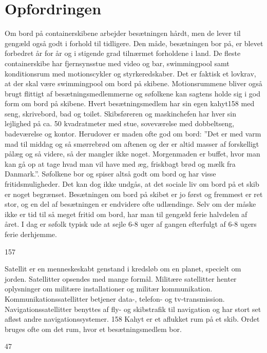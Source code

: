 \chapter{Opfordringen}\label{opfordringen}

Om bord på containerskibene arbejder besætningen hårdt, men de lever til
gengæld også godt i forhold til tidligere. Den måde, besætningen bor på,
er blevet forbedret år for år og i stigende grad tilnærmet forholdene i
land. De fleste containerskibe har fjernsynsstue med video og bar,
swimmingpool samt konditionsrum med motionscykler og styrkeredskaber.
Det er faktisk et lovkrav, at der skal være swimmingpool om bord på
skibene. Motionsrummene bliver også brugt flittigt af
besætningsmedlemmerne og søfolkene kan sagtens holde sig i god form om
bord på skibene. Hvert besætningsmedlem har sin egen kahyt158 med seng,
skrivebord, bad og toilet. Skibsføreren og maskinchefen har hver sin
lejlighed på ca. 50 kvadratmeter med stue, soveværelse med dobbeltseng,
badeværelse og kontor. Herudover er maden ofte god om bord: ''Det er med
varm mad til middag og så smørrebrød om aftenen og der er altid masser
af forskelligt pålæg og så videre, så der mangler ikke noget.
Morgenmaden er buffet, hvor man kan gå op at tage hvad man vil have med
æg, friskbagt brød og mælk fra Danmark.''. Søfolkene bor og spiser altså
godt om bord og har visse fritidsmuligheder. Det kan dog ikke undgås, at
det sociale liv om bord på et skib er noget begrænset. Besætningen om
bord på skibet er jo først og fremmest er ret stor, og en del af
besætningen er endvidere ofte udlændinge. Selv om der måske ikke er tid
til så meget fritid om bord, har man til gengæld ferie halvdelen af
året. I dag er søfolk typisk ude at sejle 6-8 uger af gangen efterfulgt
af 6-8 ugers ferie derhjemme.

157

Satellit er en menneskeskabt genstand i kredsløb om en planet, specielt
om jorden. Satellitter opsendes med mange formål. Militære satellitter
henter oplysninger om militære installationer og militær kommunikation.
Kommunikationssatellitter betjener data-, telefon- og tv-transmission.
Navigationssatellitter benyttes af fly- og skibstrafik til navigation og
har stort set afløst andre navigationssystemer. 158 Kahyt er et aflukket
rum på et skib. Ordet bruges ofte om det rum, hvor et besætningsmedlem
bor.

47
